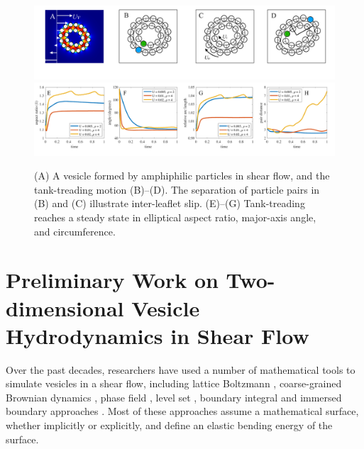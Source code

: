 \begin{figure}[!]
\begin{center}
\includegraphics[width=1\textwidth]{figures/PW_fig1A-D.pdf}
\includegraphics[width=1\textwidth]{figures/PW_fig1E-H.pdf}
\end{center}\vspace{-0.3in}
\caption{(A) A vesicle formed by amphiphilic particles in shear flow,
  and the tank-treading motion (B)--(D). The separation of particle
  pairs in (B) and (C) illustrate inter-leaflet slip.  (E)--(G)
  Tank-treading reaches a steady state in elliptical aspect ratio,
  major-axis angle, and circumference.}
\label{fig:tanktreading}
\end{figure}
\section{Preliminary Work on Two-dimensional Vesicle Hydrodynamics in Shear Flow} 
%
Over the past decades, researchers have used a number of mathematical tools 
to simulate vesicles in a shear flow, including  lattice Boltzmann \cite{KaouiHartingMisbah2011_PRE}, coarse-grained Brownian dynamics \cite{NoguchiTakasu2002_BJ},
phase field \cite{DuLiuWang2004_JCP,BibenKassnerMisbah2005_PRE}, 
level set \cite{DoyeuxGuyotChabannesEtAl2013_JCAM}, boundary integral \cite{Shravan09,Rahimian15} and 
immersed boundary approaches \cite{KimLai2010_JCP,KimLai2012_PRE,HuLaiSeolEtAl2016_JCP}. Most of these approaches
assume a mathematical surface, whether implicitly or explicitly, 
and define an elastic bending energy of the surface. 

